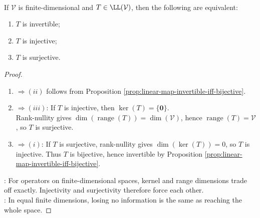\begin{theorem} \label{thm:finite-dimensional-operator-invertible-equivalences} \\
If $\mathcal{V}$ is finite-dimensional and $T \in \LL(\mathcal{V})$, then the following are equivalent:
\begin{enumerate}[label=\roman*.]
\setlength{\itemsep}{0pt}
\item $T$ is invertible;
\item $T$ is injective;
\item $T$ is surjective.
\end{enumerate}
\begin{proof}
\begin{enumerate}[label=(\roman)*.]
\setlength{\itemsep}{0pt}
\item[$(i)$] $\Rightarrow (ii)$ follows from Proposition \ref{prop:linear-map-invertible-iff-bijective}.
\item[$(ii)$] $\Rightarrow (iii)$: If $T$ is injective, then $\ker(T)=\{\mathbf{0}\}$.\\
Rank-nullity gives $\dim(\operatorname{range}(T))=\dim(\mathcal{V})$, hence $\operatorname{range}(T)=\mathcal{V}$, so $T$ is surjective.
\item[$(iii)$] $\Rightarrow (i)$: If $T$ is surjective, rank-nullity gives $\dim(\ker(T))=0$, so $T$ is injective. Thus $T$ is bijective, hence invertible by Proposition \ref{prop:linear-map-invertible-iff-bijective}.
\end{enumerate}
: For operators on finite-dimensional spaces, kernel and range dimensions trade off exactly. Injectivity and surjectivity therefore force each other.\\
: In equal finite dimensions, losing no information is the same as reaching the whole space.
\end{proof}
\end{theorem}

